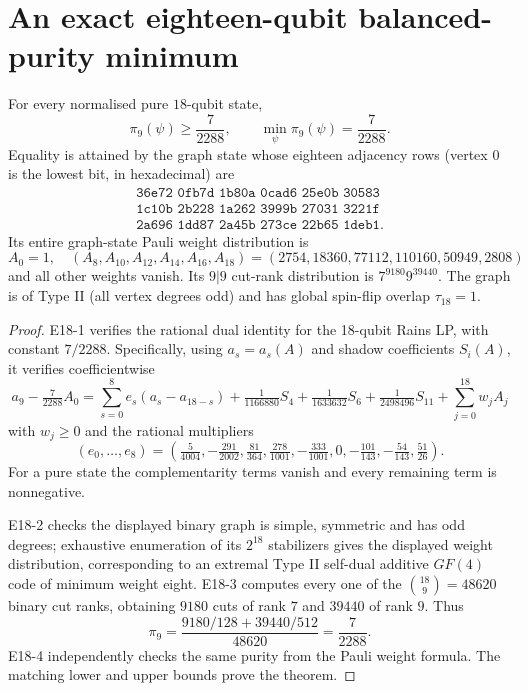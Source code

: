 \section{An exact eighteen-qubit balanced-purity minimum}
\label{sec:eighteen}

\begin{theorem}
\label{thm:eighteen}
For every normalised pure $18$-qubit state,
\[
 \boxed{\quad\pi_9(\psi)\ge\frac7{2288},\qquad
 \min_\psi\pi_9(\psi)=\frac7{2288}.\quad}
\]
Equality is attained by the graph state whose eighteen
adjacency rows (vertex $0$ is the lowest bit, in hexadecimal)
are
\[
\begin{gathered}
\texttt{36e72 0fb7d 1b80a 0cad6 25e0b 30583}\\
\texttt{1c10b 2b228 1a262 3999b 27031 3221f}\\
\texttt{2a696 1dd87 2a45b 273ce 22b65 1deb1}.
\end{gathered}
\]
Its entire graph-state Pauli weight distribution is
\[
 A_0=1,\quad
 (A_8,A_{10},A_{12},A_{14},A_{16},A_{18})
 =(2754,18360,77112,110160,50949,2808)
\]
and all other weights vanish. Its $9|9$ cut-rank
distribution is $7^{9180}9^{39440}$.
The graph is of Type II (all vertex degrees odd) and has
global spin-flip overlap $\tau_{18}=1$.
\end{theorem}
\begin{proof}
E18-1 verifies the rational dual identity for the
18-qubit Rains LP, with constant $7/2288$.
Specifically, using $a_s=a_s(A)$ and shadow coefficients
$S_i(A)$, it verifies coefficientwise
\[
 a_9-\tfrac7{2288}A_0
 =\sum_{s=0}^{8}e_s(a_s-a_{18-s})
 +\tfrac1{1166880}S_4
 +\tfrac1{1633632}S_6
 +\tfrac1{2498496}S_{11}
 +\sum_{j=0}^{18}w_jA_j
\]
with $w_j\ge0$ and the rational multipliers
\[
 (e_0,\ldots,e_8)=
 \left(\tfrac5{4004},-\tfrac{291}{2002},\tfrac{81}{364},
 \tfrac{278}{1001},-\tfrac{333}{1001},0,
 -\tfrac{101}{143},-\tfrac{54}{143},\tfrac{51}{26}\right).
\]
For a pure state the complementarity terms vanish and
every remaining term is nonnegative.

E18-2 checks the displayed binary graph is simple,
symmetric and has odd degrees; exhaustive enumeration of
its $2^{18}$ stabilizers gives the displayed weight
distribution, corresponding to an extremal Type II
self-dual additive $GF(4)$ code of minimum weight eight.
E18-3 computes every one of the $\binom{18}{9}=48620$
binary cut ranks, obtaining $9180$ cuts of rank $7$
and $39440$ of rank $9$. Thus
\[
 \pi_9=
 \frac{9180/128+39440/512}{48620}=\frac7{2288}.
\]
E18-4 independently checks the same purity from the
Pauli weight formula. The matching lower and upper
bounds prove the theorem.
\end{proof}

